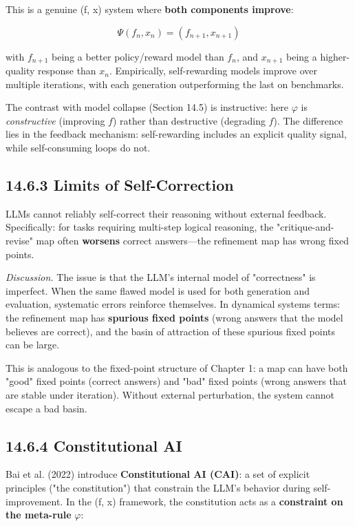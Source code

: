 This is a genuine (f, x) system where \textbf{both components improve}:

\[
\Psi(f_n, x_n) = (f_{n+1}, x_{n+1})
\]

with $f_{n+1}$ being a better policy/reward model than $f_n$, and $x_{n+1}$ being a higher-quality response than $x_n$. Empirically, self-rewarding models improve over multiple iterations, with each generation outperforming the last on benchmarks.

The contrast with model collapse (Section 14.5) is instructive: here $\varphi$ is \textit{constructive} (improving $f$) rather than destructive (degrading $f$). The difference lies in the feedback mechanism: self-rewarding includes an explicit quality signal, while self-consuming loops do not.

\subsection{14.6.3 Limits of Self-Correction}

\begin{theorem}
LLMs cannot reliably self-correct their reasoning without external feedback. Specifically: for tasks requiring multi-step logical reasoning, the "critique-and-revise" map often \textbf{worsens} correct answers---the refinement map has wrong fixed points.

\textit{Discussion.} The issue is that the LLM's internal model of "correctness" is imperfect. When the same flawed model is used for both generation and evaluation, systematic errors reinforce themselves. In dynamical systems terms: the refinement map has \textbf{spurious fixed points} (wrong answers that the model believes are correct), and the basin of attraction of these spurious fixed points can be large.

This is analogous to the fixed-point structure of Chapter 1: a map can have both "good" fixed points (correct answers) and "bad" fixed points (wrong answers that are stable under iteration). Without external perturbation, the system cannot escape a bad basin.
\end{theorem}

\subsection{14.6.4 Constitutional AI}

Bai et al. (2022) introduce \textbf{Constitutional AI (CAI)}: a set of explicit principles ("the constitution") that constrain the LLM's behavior during self-improvement. In the (f, x) framework, the constitution acts as a \textbf{constraint on the meta-rule} $\varphi$:

